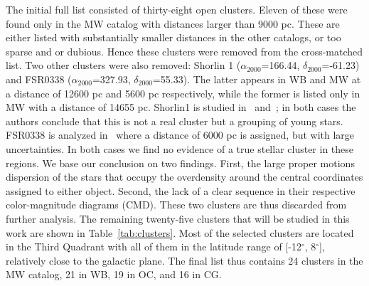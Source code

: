 \documentclass{aa}
\begin{document}
 The initial full list consisted of thirty-eight open clusters. Eleven of these
 were found only in the MW catalog with distances larger than 9000 pc. These are
 either listed with substantially smaller distances in the other catalogs, or
 too sparse and or dubious. Hence these clusters were removed from the
 cross-matched list.
 Two other clusters were also removed: Shorlin 1 ($\alpha_{2000}$=166.44,
 $\delta_{2000}$=-61.23) and FSR0338
 ($\alpha_{2000}$=327.93, $\delta_{2000}$=55.33). The latter appears in WB and
 MW at a distance of 12600 pc and 5600 pc respectively, while the former is
 listed only in MW with a distance of 14655 pc. Shorlin1 is studied
 in~\cite{Carraro_2009} and~\cite{Turner_2012}; in both cases the authors
 conclude that this is not a real cluster but a grouping of young stars.
 FSR0338 is analyzed in~\cite{Froebrich_2010} where a distance of 6000 pc is
 assigned, but with large uncertainties.
 In both cases we find no evidence of a true stellar cluster in these regions.
 We base our conclusion on two findings. First, the large proper motions
 dispersion of the stars that occupy the overdensity around the central
 coordinates assigned to either object. Second, the lack of a clear sequence in
 their respective color-magnitude diagrams (CMD). These two clusters are thus
 discarded from further analysis. The remaining twenty-five clusters that will
 be studied in this work are shown in Table~\ref{tab:clusters}. Most of the
 selected clusters are located in the Third Quadrant with all of them in the
 latitude range of [-12$^{\circ}$, 8$^{\circ}$], relatively close to the
 galactic plane. The final list thus contains 24 clusters in the MW catalog,
 21 in WB, 19 in OC, and 16 in CG.
\end{document}

